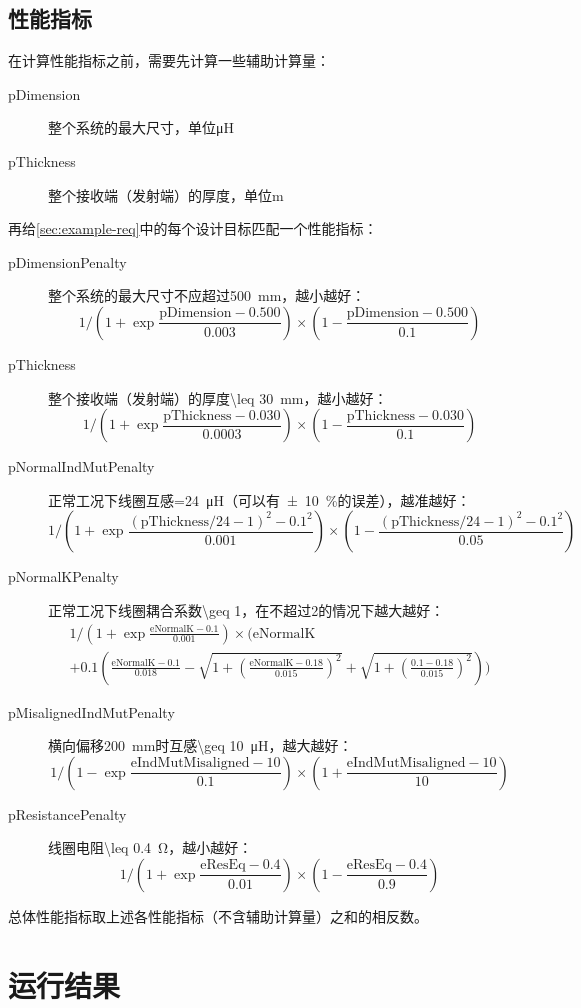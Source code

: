 \documentclass[index]{subfiles}
\begin{document}
\subsection{性能指标}
在计算性能指标之前，需要先计算一些辅助计算量：
\begin{description}
  \item[pDimension] 整个系统的最大尺寸，单位\si{\micro\henry}
  \item[pThickness] 整个接收端（发射端）的厚度，单位\si{\metre}
\end{description}
再给\cref{sec:example-req}中的每个设计目标匹配一个性能指标：
\begin{description}
  \item[pDimensionPenalty] 整个系统的最大尺寸不应超过\SI{500}{\milli\metre}，越小越好：
  \[1{\Big/}\!\left(1+\exp \frac{\text{pDimension}-0.500}{0.003}\right)\times\left(1 - \frac{\text{pDimension}-0.500}{0.1}\right)\]
  \item[pThickness] 整个接收端（发射端）的厚度\SI{\leq 30}{\milli\metre}，越小越好：
  \[1{\Big/}\!\left(1+\exp \frac{\text{pThickness}-0.030}{0.0003}\right)\times\left(1 - \frac{\text{pThickness}-0.030}{0.1}\right)\]
  \item[pNormalIndMutPenalty] 正常工况下线圈互感\SI{=24}{\micro\henry}（可以有\SI{\pm 10}{\percent}的误差），越准越好：
  \[1{\Big/}\!\left(1+\exp \frac{(\text{pThickness}/24-1)^2-0.1^2}{0.001}\right)\times\left(1 - \frac{(\text{pThickness}/24-1)^2-0.1^2}{0.05}\right)\]
  \item[pNormalKPenalty] 正常工况下线圈耦合系数\num{\geq 1}，在不超过2的情况下越大越好：
  \[
  \begin{multlined}
  1{\Big/}\!\left(1+\exp \frac{\text{eNormalK}-0.1}{0.001}\right)\times{\Bigg(}\text{eNormalK} \\
  + 0.1\left(\frac{\text{eNormalK}-0.1}{0.018} - \sqrt{1+\left(\scriptstyle\frac{\text{eNormalK}-0.18}{0.015}\right)^2}
  + \sqrt{1+\left(\scriptstyle\frac{0.1-0.18}{0.015}\right)^2}\right){\Bigg)}
  \end{multlined}
  \]
  \item[pMisalignedIndMutPenalty] 横向偏移\SI{200}{\milli\metre}时互感\SI{\geq 10}{\micro\henry}，越大越好：
  \[1{\Big/}\!\left(1-\exp \frac{\text{eIndMutMisaligned}-10}{0.1}\right)\times\left(1 + \frac{\text{eIndMutMisaligned}-10}{10}\right)\]
  \item[pResistancePenalty] 线圈电阻\SI{\leq 0.4}{\ohm}，越小越好：
  \[1{\Big/}\!\left(1+\exp \frac{\text{eResEq}-0.4}{0.01}\right)\times\left(1 - \frac{\text{eResEq}-0.4}{0.9}\right)\]
\end{description}

总体性能指标取上述各性能指标（不含辅助计算量）之和的相反数。

\section{运行结果}
\end{document}
